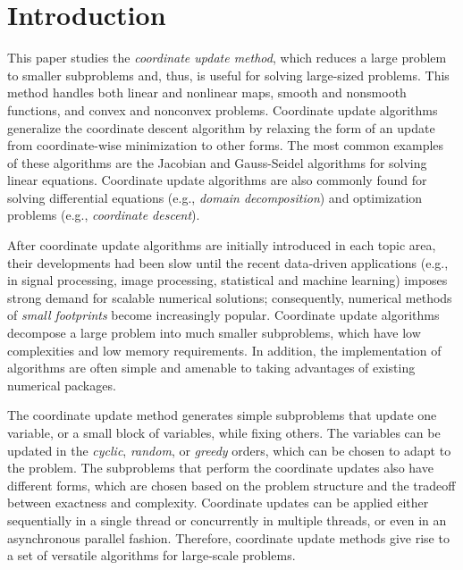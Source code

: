 \section{Introduction}
This paper studies the \emph{coordinate update method}, which reduces a large problem to smaller subproblems and, thus, is useful for solving large-sized problems. This method handles both  linear and nonlinear maps, smooth and nonsmooth functions, and convex and nonconvex problems. Coordinate update algorithms generalize the coordinate descent algorithm  by relaxing the form of an update from coordinate-wise minimization to other forms. The most common examples of these algorithms are the Jacobian and Gauss-Seidel algorithms for solving linear equations. Coordinate update algorithms are also commonly found for solving differential equations (e.g., \emph{domain decomposition}) and optimization problems (e.g., \emph{coordinate descent}).  

After coordinate update algorithms are initially introduced in each topic area, their developments  had been slow until the recent data-driven applications (e.g., in signal processing,  image processing, statistical and machine learning) imposes strong demand for scalable numerical solutions; consequently,  numerical methods of \emph{small footprints} become increasingly popular. Coordinate update algorithms decompose a large problem into much smaller subproblems, which have low complexities and low memory requirements. In addition, the implementation of algorithms are often simple and amenable to taking advantages of existing numerical packages. 

The coordinate update method generates simple subproblems that update one variable, or a small block of variables, while fixing others. The variables can be updated in  the \textit{cyclic}, \textit{random}, or \textit{greedy} orders, which can be chosen to adapt to the problem. The subproblems that perform the coordinate updates also have different forms, which are chosen based on the problem structure and the tradeoff between exactness and complexity. Coordinate updates can be  applied either sequentially in a single thread or concurrently in multiple threads, or even in an asynchronous parallel fashion. Therefore, coordinate update methods give rise to a set of versatile algorithms for large-scale problems.


